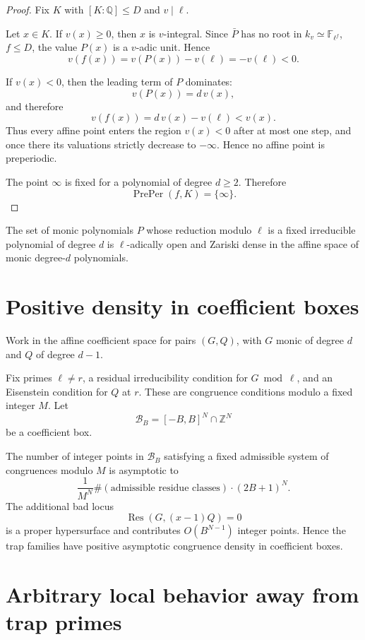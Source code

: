 \documentclass[11pt]{article}
\begin{document}
\begin{proof}
Fix \(K\) with \([K:\mathbb Q]\le D\) and \(v\mid\ell\).

Let \(x\in K\). If \(v(x)\ge0\), then \(x\) is \(v\)-integral. Since \(\bar P\) has no root in \(k_v\simeq\mathbb F_{\ell^f}\), \(f\le D\), the value \(P(x)\) is a \(v\)-adic unit. Hence
\[
v(f(x))=v(P(x))-v(\ell)=-v(\ell)<0.
\]

If \(v(x)<0\), then the leading term of \(P\) dominates:
\[
v(P(x))=d\,v(x),
\]
and therefore
\[
v(f(x))=d\,v(x)-v(\ell)<v(x).
\]
Thus every affine point enters the region \(v(x)<0\) after at most one step, and once there its valuations strictly decrease to \(-\infty\). Hence no affine point is preperiodic.

The point \(\infty\) is fixed for a polynomial of degree \(d\ge2\). Therefore
\[
\operatorname{PrePer}(f,K)=\{\infty\}.
\]
\end{proof}

The set of monic polynomials \(P\) whose reduction modulo \(\ell\) is a fixed irreducible polynomial of degree \(d\) is \(\ell\)-adically open and Zariski dense in the affine space of monic degree-\(d\) polynomials.

\section{Positive density in coefficient boxes}

Work in the affine coefficient space for pairs \((G,Q)\), with \(G\) monic of degree \(d\) and \(Q\) of degree \(d-1\).

Fix primes \(\ell\ne r\), a residual irreducibility condition for \(G\bmod \ell\), and an Eisenstein condition for \(Q\) at \(r\). These are congruence conditions modulo a fixed integer \(M\). Let
\[
\mathcal B_B=[-B,B]^N\cap\mathbb Z^N
\]
be a coefficient box.

The number of integer points in \(\mathcal B_B\) satisfying a fixed admissible system of congruences modulo \(M\) is asymptotic to
\[
\frac{1}{M^N}\#(\text{admissible residue classes})\cdot (2B+1)^N.
\]
The additional bad locus
\[
\operatorname{Res}(G,(x-1)Q)=0
\]
is a proper hypersurface and contributes \(O(B^{N-1})\) integer points. Hence the trap families have positive asymptotic congruence density in coefficient boxes.

\section{Arbitrary local behavior away from trap primes}
\end{document}
